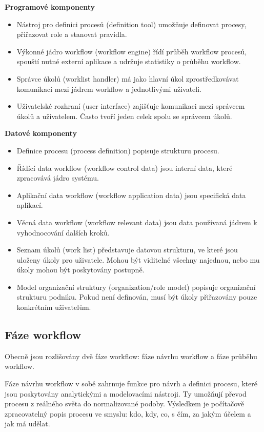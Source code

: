 \documentclass{fithesis}
\begin{document}
\textbf{Programové komponenty}

\begin{itemize}
\item Nástroj pro definici procesů (definition tool) umožňuje definovat procesy, přiřazovat role a stanovat pravidla.
\item Výkonné jádro workflow (workflow engine) řídí průběh workflow procesů, spouští nutné externí aplikace a udržuje statistiky o průběhu workflow.
\item Správce úkolů (worklist handler) má jako hlavní úkol zprostředkovávat komunikaci mezi jádrem workflow a jednotlivými uživateli.
\item Uživatelské rozhraní (user interface) zajišťuje komunikaci mezi správcem úkolů a uživatelem. Často tvoří jeden celek spolu se správcem úkolů.
\end{itemize}

\textbf{Datové komponenty}

\begin{itemize}
\item Definice procesu (process definition) popisuje strukturu procesu.
\item Řídící data workflow (workflow control data) jsou interní data, které zpracovává jádro systému.
\item Aplikační data workflow (workflow application data) jsou specifická data aplikací.
\item Věcná data workflow (workflow relevant data) jsou data používaná jádrem k vyhodnocování dalších kroků.
\item Seznam úkolů (work list) představuje datovou strukturu, ve které jsou uloženy úkoly pro uživatele. Mohou být viditelné všechny najednou, nebo mu úkoly mohou být poskytovány postupně.
\item Model organizační struktury (organization/role model) popisuje organizační strukturu podniku. Pokud není definován, musí být úkoly přiřazovány pouze konkrétním uživatelům.
\end{itemize}

\subsection{Fáze workflow}
Obecně jsou rozlišovány dvě fáze workflow: fáze návrhu workflow a fáze průběhu workflow. \cite{workflow}

Fáze návrhu workflow v sobě zahrnuje funkce pro návrh a definici procesu, které jsou poskytovány analytickými a modelovacími nástroji. Ty umožňují převod procesu z reálného světa do normalizované podoby. Výsledkem je počítačově zpracovatelný popis procesu ve smyslu: kdo, kdy, co, s čím, za jakým účelem a jak má udělat.
\end{document}
